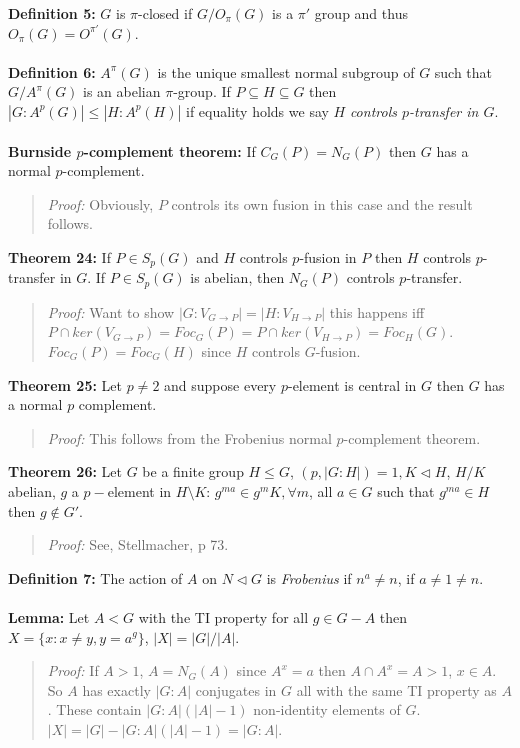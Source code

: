 {\bf Definition 5:} $G$ is $\pi$-closed if $G/O_{\pi}(G)$ is a $\pi'$ group and thus
$O_{\pi}(G)=O^{\pi'}(G)$.\\
\\
{\bf Definition 6:} $A^{\pi}(G)$ is the unique smallest normal subgroup of $G$ such that
$G/A^{\pi}(G)$ is an abelian $\pi$-group.  If $P \subseteq H \subseteq G$ then
$ |G:A^p(G)| \le |H:A^p(H)|$ if equality holds we say $H$ \emph {controls $p$-transfer in $G$}.
\\
\\
{\bf Burnside $p$-complement theorem:}  If $C_G(P)= N_G(P)$ then $G$ has a normal $p$-complement.
\begin{quote}
\emph{Proof:}  Obviously, $P$ controls its own fusion in this case and the result follows.
\end{quote}
{\bf Theorem 24:}  If $P \in S_p(G)$ and $H$ controls $p$-fusion in $P$ then $H$ controls $p$-transfer
in $G$.  If $P \in S_p(G)$ is abelian, then $N_G(P)$ controls $p$-transfer.  
\begin{quote}
\emph{Proof:}  
Want to show $|G:V_{G \rightarrow P}| = |H:V_{H \rightarrow P}|$ this happens iff
$P \cap ker(V_{G \rightarrow P}) = Foc_G(P) = P \cap ker(V_{H \rightarrow P}) = Foc_H(G)$.
$Foc_G(P) = Foc_G(H)$ since $H$ controls $G$-fusion.
\end{quote}
{\bf Theorem 25:} 
Let $p \ne 2$ and suppose every $p$-element is central in
$G$ then $G$ has a normal $p$ complement.
\begin{quote}
\emph{Proof:}  
This follows from the Frobenius normal $p$-complement theorem.
\end{quote}
{\bf Theorem 26:} 
Let $G$ be a finite group $H \le G$, $(p, |G:H|)=1, K \lhd H$, $H/K$ abelian,
$g$ a $p-$element in $H \setminus K$: $g^{ma} \in g^m K, \forall m$, all $a \in G$ such that
$g^{ma} \in H$ then $g \notin G'$.
\begin{quote}
\emph{Proof:}  
See, Stellmacher,  p 73.
\end{quote}
{\bf Definition 7:} The action of $A$ on $N \lhd G$ is \emph{Frobenius} if $n^a \neq n$, if $a \neq 1 \neq n$.
\\
\\
{\bf Lemma:}  Let $A<G$ with the TI property for all $g \in G-A$ then
$X= \{x: x \neq y, y= a^g \}$, $|X|= |G|/|A|$.
\begin{quote}
\emph{Proof:}  
If $A>1$, $A=N_G(A)$ since $A^x=a$ then $A \cap A^x=A>1$, $x \in A$.  So $A$ has exactly $|G:A|$ conjugates
in $G$ all with the same TI property as $A$.  These contain $|G:A|(|A|-1)$ non-identity elements of $G$.
$|X|= |G| - |G:A| (|A|-1) = |G:A|$.
\end{quote}
